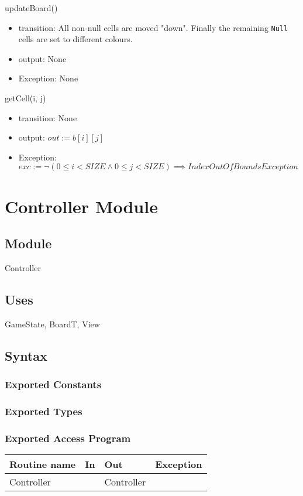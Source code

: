 \documentclass[11pt]{article}
\begin{document}
\begin{itemize}
updateBoard()
\begin{itemize}
\item transition: All non-null cells are moved "down". Finally the remaining \texttt{Null} cells are set to different colours.
\item output: None
\item Exception: None
\end{itemize}

getCell(i, j)
\begin{itemize}
\item transition: None
\item output: \(out := b[i][j]\)
\item Exception: \(exc := ¬ (0 \leq i < SIZE \land 0 \leq j < SIZE) \implies IndexOutOfBoundsException\)
\end{itemize}

\newpage
\end{itemize}
\section{Controller Module}
\label{sec:orga3445b9}
\subsection*{Module}
\label{sec:org06c2bc5}
Controller
\subsection*{Uses}
\label{sec:orgc6af372}
GameState, BoardT, View
\subsection*{Syntax}
\label{sec:orga46308e}
\subsubsection*{Exported Constants}
\label{sec:orgb166774}
\subsubsection*{Exported Types}
\label{sec:org578c6de}
\subsubsection*{Exported Access Program}
\label{sec:org49f0396}
\begin{center}
\begin{tabular}{l|l|l|l}
Routine name & In & Out & Exception\\
\hline
Controller &  & Controller & \\
\end{tabular}
\end{center}
\end{document}
